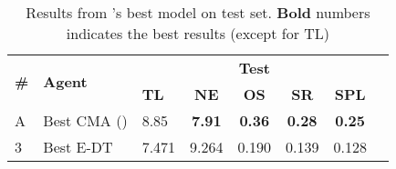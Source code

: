 \begin{table*}

\caption{\label{table:all_test_final} Results from \citet{VLNCE}'s best model on test set. \textbf{Bold} numbers indicates the best results (except for TL)}
\renewcommand{\arraystretch}{1.2}
\centering
\small\addtolength{\tabcolsep}{-2.3pt}
\begin{tabular}{@{}lllccccc@{}}
\toprule
   \multirow{2}{*}{\textbf{\#}}
  & \multirow{2}{*}{\textbf{Agent}}
  & \multicolumn{5}{c}{\textbf{Test}} \\
  \cmidrule(l){3-7}
  & & \textbf{TL} & \textbf{NE} & \textbf{OS} & \textbf{SR} & \textbf{SPL} \\
\midrule
A & Best CMA (\citet{VLNCE})  & 8.85 & \textbf{7.91} & \textbf{0.36} & \textbf{0.28} & \textbf{0.25}  \\
\midrule
3 & Best E-DT  & 7.471 & 	9.264 & 0.190 & 0.139 & 0.128  \\

\bottomrule
\end{tabular}
\end{table*}
